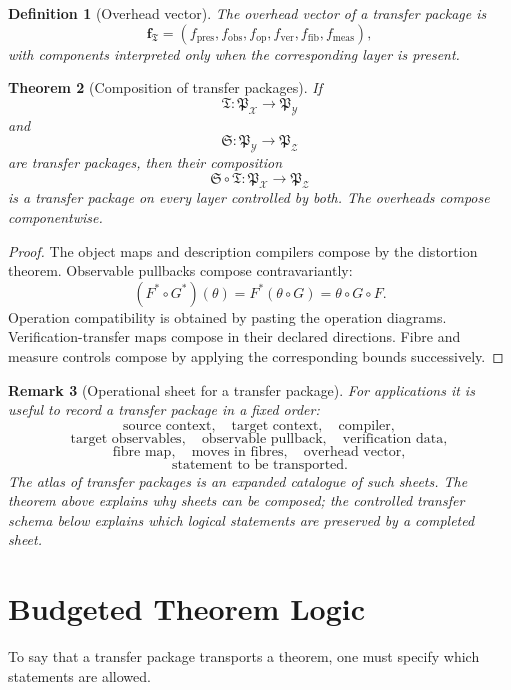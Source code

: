 \documentclass[11pt]{article}
\newtheorem{theorem}{Theorem}[section]
\newtheorem{definition}[theorem]{Definition}
\newtheorem{remark}[theorem]{Remark}
\begin{document}
\begin{definition}[Overhead vector]
The overhead vector of a transfer package is
\[
\mathbf f_\mathfrak T
=
(f_{\mathrm{pres}},f_{\mathrm{obs}},f_{\mathrm{op}},f_{\mathrm{ver}},f_{\mathrm{fib}},f_{\mathrm{meas}}),
\]
with components interpreted only when the corresponding layer is present.
\end{definition}

\begin{theorem}[Composition of transfer packages]
If
\[
\mathfrak T:\mathfrak P_\mathcal X\to\mathfrak P_\mathcal Y
\]
and
\[
\mathfrak S:\mathfrak P_\mathcal Y\to\mathfrak P_\mathcal Z
\]
are transfer packages, then their composition
\[
\mathfrak S\circ\mathfrak T:\mathfrak P_\mathcal X\to\mathfrak P_\mathcal Z
\]
is a transfer package on every layer controlled by both. The overheads compose componentwise.
\end{theorem}

\begin{proof}
The object maps and description compilers compose by the distortion theorem. Observable pullbacks compose contravariantly:
\[
(F^\ast\circ G^\ast)(\theta)
=
F^\ast(\theta\circ G)
=
\theta\circ G\circ F.
\]
Operation compatibility is obtained by pasting the operation diagrams. Verification-transfer maps compose in their declared directions. Fibre and measure controls compose by applying the corresponding bounds successively.
\end{proof}

\begin{remark}[Operational sheet for a transfer package]
For applications it is useful to record a transfer package in a fixed order:
\[
\text{source context},\quad
\text{target context},\quad
\text{compiler},
\]
\[
\text{target observables},\quad
\text{observable pullback},\quad
\text{verification data},
\]
\[
\text{fibre map},\quad
\text{moves in fibres},\quad
\text{overhead vector},
\]
\[
\text{statement to be transported}.
\]
The atlas of transfer packages is an expanded catalogue of such sheets. The theorem above explains why sheets can be composed; the controlled transfer schema below explains which logical statements are preserved by a completed sheet.
\end{remark}

\section{Budgeted Theorem Logic}

To say that a transfer package transports a theorem, one must specify which statements are allowed.
\end{document}

